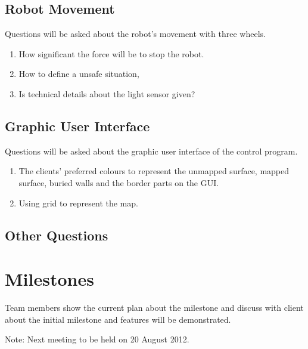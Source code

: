 \documentclass[11pt, a4paper]{article}
\begin{document}
\subsection{Robot Movement}
Questions will be asked about the robot's movement with three wheels.
\begin{enumerate}
\item How significant the force will be to stop the robot.
\item How to define a unsafe situation, 
\item Is technical details about the light sensor given?
\end{enumerate}

\subsection{Graphic User Interface}
Questions will be asked about the graphic user interface of the control program.
\begin{enumerate}
\item The clients' preferred colours to represent the unmapped surface, mapped surface, buried walls and the border parts on the GUI.
\item Using grid to represent the map.
\end{enumerate}

\subsection{Other Questions}
\section{Milestones}

Team members show the current plan about the milestone and discuss with client about the initial milestone and features will be demonstrated.

\vspace*{10pt}
\noindent Note: Next meeting to be held on 20 August 2012.
\end{document}
